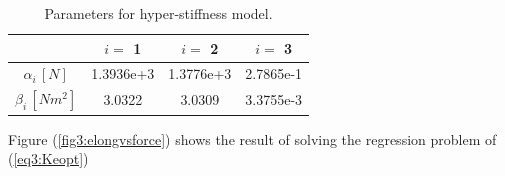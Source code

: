 \begin{table}[H]
    \centering
        \caption{Parameters for hyper-stiffness model.}
\begin{tabular}{|c|c|c|c|} \hline
            &  $i = $ 1      &    $i = $    2   &  $i = $ 3  \\ \hline
   $\alpha_i \hspace{2pt}[N]$    &    1.3936e+3    & 1.3776e+3    & 2.7865e-1 \\ \hline
   $\beta_i \hspace{2pt}  [Nm^2] $     &  3.0322 & 3.0309    &  3.3755e-3\\ \hline
\end{tabular}
    \label{tab3:stiffnessparameters}
\end{table}

Figure (\ref{fig3:elongvsforce}) shows the result of solving the regression problem of (\ref{eq3:Keopt})


